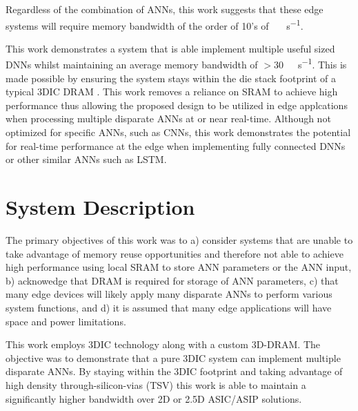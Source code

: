 \documentclass[journal]{IEEEtran}
\begin{document}
Regardless of the combination of ANNs, this work suggests that these edge systems will require memory bandwidth of the order of 10's of \SI[per-mode=symbol]{}{\tera \bit \per \second}.

This work demonstrates a system that is able implement multiple useful sized DNNs whilst maintaining an average memory bandwidth of $>$\SI[per-mode=symbol]{30}{\tera \bit \per \second}.
This is made possible by ensuring the system stays within the die stack footprint of a typical 3DIC DRAM .
This work removes a reliance on SRAM to achieve high performance thus allowing the proposed design to be utilized in edge applcations when processing multiple disparate ANNs at or near real-time.
Although not optimized for specific ANNs, such as CNNs, this work demonstrates the potential for real-time performance at the edge when implementing fully connected DNNs or other similar ANNs such as LSTM.


\section{System Description}
\label{System Description}


The primary objectives of this work was to a) consider systems that are unable to take advantage of memory reuse opportunities and therefore not able to achieve high performance using
local SRAM to store ANN parameters or the ANN input, b) acknowedge that DRAM is required for storage of ANN parameters, c) that many edge devices will likely apply many disparate ANNs
to perform various system functions, and d) it is assumed that many edge applications will have space and power limitations.

This work employs 3DIC technology along with a custom 3D-DRAM. The objective was to demonstrate that a pure 3DIC system can implement multiple disparate ANNs. By staying within the 3DIC footprint and taking advantage of high
density through-silicon-vias (TSV) this work is able to maintain a significantly higher bandwidth over 2D or 2.5D ASIC/ASIP solutions.
\end{document}
